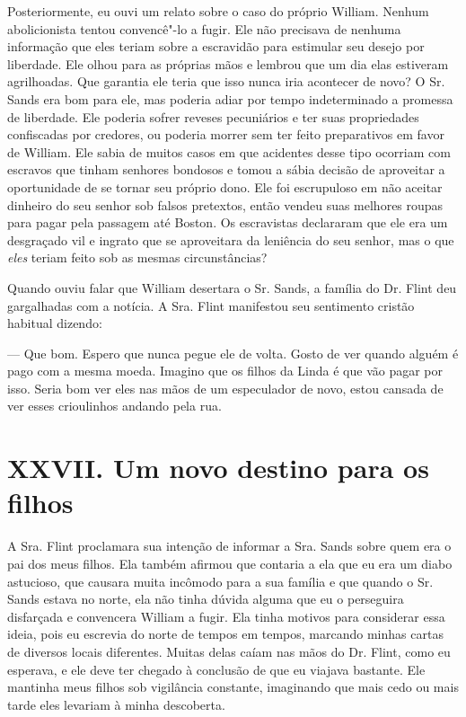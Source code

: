 Posteriormente, eu ouvi um relato sobre
o caso do próprio William. Nenhum abolicionista tentou convencê"-lo a
fugir. Ele não precisava de nenhuma informação que eles teriam sobre a
escravidão para estimular seu desejo por liberdade. Ele olhou para as
próprias mãos e lembrou que um dia elas estiveram agrilhoadas. Que
garantia ele teria que isso nunca iria acontecer de novo? O Sr. Sands
era bom para ele, mas poderia adiar por tempo indeterminado a promessa
de liberdade. Ele poderia sofrer reveses pecuniários e ter suas
propriedades confiscadas por credores, ou poderia morrer sem ter feito
preparativos em favor de William. Ele sabia de muitos casos em que
acidentes desse tipo ocorriam com escravos que tinham senhores bondosos
e tomou a sábia decisão de aproveitar a oportunidade de se tornar seu
próprio dono. Ele foi escrupuloso em não aceitar dinheiro do seu senhor
sob falsos pretextos, então vendeu suas melhores roupas para pagar pela
passagem até Boston. Os escravistas declararam que ele era um desgraçado
vil e ingrato que se aproveitara da leniência do seu senhor, mas o que
\emph{eles} teriam feito sob as mesmas circunstâncias?

Quando ouviu falar que William
desertara o Sr. Sands, a família do Dr. Flint deu gargalhadas com a
notícia. A Sra. Flint manifestou seu sentimento cristão habitual
dizendo:

--- Que bom. Espero que nunca pegue ele de volta. Gosto de ver quando
alguém é pago com a mesma moeda. Imagino que os filhos da Linda é que
vão pagar por isso. Seria bom ver eles nas mãos de um especulador de
novo, estou cansada de ver esses crioulinhos andando pela rua.

\chapter{XXVII. Um novo destino para os
filhos}

A Sra. Flint proclamara sua intenção de
informar a Sra. Sands sobre quem era o pai dos meus filhos. Ela também
afirmou que contaria a ela que eu era um diabo astucioso, que causara
muita incômodo para a sua família e que quando o Sr. Sands estava no
norte, ela não tinha dúvida alguma que eu o perseguira disfarçada e
convencera William a fugir. Ela tinha motivos para considerar essa
ideia, pois eu escrevia do norte de tempos em tempos, marcando minhas
cartas de diversos locais diferentes. Muitas delas caíam nas mãos do Dr.
Flint, como eu esperava, e ele deve ter chegado à conclusão de que eu
viajava bastante. Ele mantinha meus filhos sob vigilância constante,
imaginando que mais cedo ou mais tarde eles levariam à minha descoberta.


